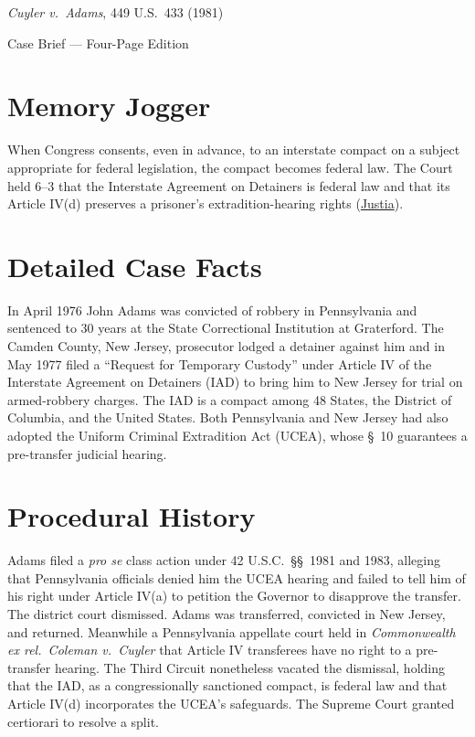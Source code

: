 \documentclass[12pt]{article}
\begin{document}
\begin{center}
{\LARGE \textit{Cuyler v.\ Adams}, 449 U.S.\ 433 (1981)\par}
\vspace{0.8em}
{\large Case Brief --- Four-Page Edition\par}
\end{center}
\vspace{1em}

\section{Memory Jogger}

When Congress consents, even in advance, to an interstate compact on a subject appropriate for federal legislation, the compact becomes federal law. The Court held 6--3 that the Interstate Agreement on Detainers is federal law and that its Article IV(d) preserves a prisoner's extradition-hearing rights (\href{https://supreme.justia.com/cases/federal/us/449/433/}{Justia}).

\section{Detailed Case Facts}

In April 1976 John Adams was convicted of robbery in Pennsylvania and sentenced to 30 years at the State Correctional Institution at Graterford. The Camden County, New Jersey, prosecutor lodged a detainer against him and in May 1977 filed a ``Request for Temporary Custody'' under Article IV of the Interstate Agreement on Detainers (IAD) to bring him to New Jersey for trial on armed-robbery charges. The IAD is a compact among 48 States, the District of Columbia, and the United States. Both Pennsylvania and New Jersey had also adopted the Uniform Criminal Extradition Act (UCEA), whose \S~10 guarantees a pre-transfer judicial hearing.

\section{Procedural History}

Adams filed a \textit{pro se} class action under 42 U.S.C.\ \S\S~1981 and 1983, alleging that Pennsylvania officials denied him the UCEA hearing and failed to tell him of his right under Article IV(a) to petition the Governor to disapprove the transfer. The district court dismissed. Adams was transferred, convicted in New Jersey, and returned. Meanwhile a Pennsylvania appellate court held in \textit{Commonwealth ex rel.\ Coleman v.\ Cuyler} that Article IV transferees have no right to a pre-transfer hearing. The Third Circuit nonetheless vacated the dismissal, holding that the IAD, as a congressionally sanctioned compact, is federal law and that Article IV(d) incorporates the UCEA's safeguards. The Supreme Court granted certiorari to resolve a split.
\end{document}
